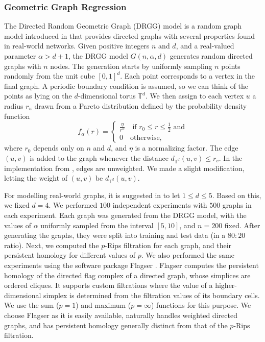 \documentclass[a4paper,11pt]{article}
\theoremstyle{remark}
\begin{document}
\subsubsection{Geometric Graph Regression}\label{sec:geometric_graph_regression}
The Directed Random Geometric Graph (DRGG) model is a random graph model introduced in \cite{michel2029} that provides directed graphs with several properties found in real-world networks. Given positive integers $n$ and $d$, and a real-valued parameter $\alpha > d+1$, the DRGG model $G(n,\alpha,d)$ generates random directed graphs with $n$ nodes. The generation starts by uniformly sampling $n$ points randomly from the unit cube $[0,1]^d$. Each point corresponds to a vertex in the final graph. A periodic boundary condition is assumed, so we can think of the points as lying on the $d$-dimensional torus $\mathbb{T}^d$. We then assign to each vertex $u$ a radius $r_u$ drawn from a Pareto distribution defined by the probability density function
\begin{equation*}
    f_\alpha(r) = \begin{cases}
        \frac{\eta}{r^\alpha}\quad\text{if }r_0\leq r\leq \frac{1}{2}\text{ and}\\
        0\quad\text{otherwise,}
    \end{cases}
\end{equation*}
where $r_0$ depends only on $n$ and $d$, and $\eta$ is a normalizing factor. The edge $(u,v)$ is added to the graph whenever the distance $d_{\mathbb{T}^d}(u,v)\leq r_v$. In the implementation from \cite{michel2029}, edges are unweighted. We made a slight modification, letting the weight of $(u,v)$ be $d_{\mathbb{T}^d}(u,v)$.

For modelling real-world graphs, it is suggested in \cite{michel2029} to let $1\leq d\leq 5$. Based on this, we fixed $d=4$. We performed $100$ independent experiments with $500$ graphs in each experiment. Each graph was generated from the DRGG model, with the values of $\alpha$ uniformly sampled from the interval $[5,10]$, and $n=200$ fixed. After generating the graphs, they were split into training and test data (in a $80:20$ ratio). Next, we computed the $p$-Rips filtration for each graph, and their persistent homology for different values of $p$. We also performed the same experiments using the software package Flagser \cite{lutgehetmann2020computing}. Flagser computes the persistent homology of the directed flag complex of a directed graph, whose simplices are ordered cliques. It supports custom filtrations where the value of a higher-dimensional simplex is determined from the filtration values of its boundary cells. We use the sum ($p=1$) and maximum ($p=\infty$) functions for this purpose. We choose Flagser as it is easily available, naturally handles weighted directed graphs, and has persistent homology generally distinct from that of the $p$-Rips filtration.
\end{document}
